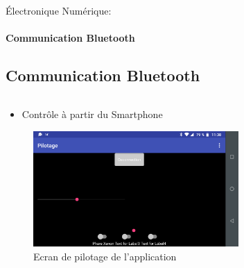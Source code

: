 \documentclass{beamer}
\begin{document}
	\begin{frame}{Électronique Numérique:}
		\framesubtitle{Communication Bluetooth}
		\subsection[Bluetooth]{Communication Bluetooth}
		\begin{columns}[T]
	  		\begin{column}{0.5\textwidth}
		    	\begin{itemize}
		    		\item Contrôle à partir du Smartphone
		    	\end{itemize}
		    	\begin{figure}
		    		\includegraphics[width=0.8\textwidth]{../Illus/AppPilotage.png}
	    			\caption{Ecran de pilotage de l'application}
	    		 \end{figure}
	  		\end{column}
	  		\begin{column}{0.5\textwidth}
	  			\begin{figure}

\end{figure}
\end{column}
\end{columns}
\end{frame}
\end{document}
